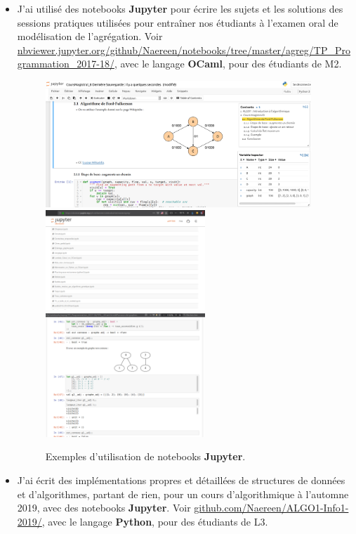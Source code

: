 \documentclass[runningheads]{llncs}
\newcommand{\Jupyter}{\textbf{Jupyter}}
\begin{document}
\begin{itemize}
    \item
    J'ai utilisé des notebooks \Jupyter{} pour écrire les sujets et les solutions des sessions pratiques utilisées pour entraîner nos étudiants à l'examen oral de modélisation de l'agrégation.
    Voir \url{nbviewer.jupyter.org/github/Naereen/notebooks/tree/master/agreg/TP_Programmation_2017-18/},
    avec le langage \textbf{OCaml}, pour des étudiants de M2.

    \begin{figure}[!h]
        \centering
        \includegraphics[width=10cm]{apercu_ENS_agreg_4.png}
        \includegraphics[width=6cm]{apercu_ENS_agreg_1.png}
        \includegraphics[width=6cm]{apercu_ENS_agreg_3.png}
        \caption{Exemples d'utilisation de notebooks \Jupyter.}
        \label{}
    \end{figure}


    \item
    J'ai écrit des implémentations propres et détaillées de structures de données et d'algorithmes, partant de rien, pour un cours d'algorithmique à l'automne 2019, avec des notebooks \Jupyter.
    Voir \url{github.com/Naereen/ALGO1-Info1-2019/},
    avec le langage \textbf{Python}, pour des étudiants de L3.


\end{itemize}
\end{document}
